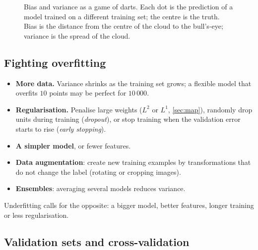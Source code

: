 \begin{figure}[htbp]
\caption{Bias and variance as a game of darts. Each dot is the prediction of a
  model trained on a different training set; the centre is the truth. Bias is
  the distance from the centre of the cloud to the bull's-eye; variance is the
  spread of the cloud.}
\label{fig:bias-variance}
\end{figure}

\subsection{Fighting overfitting}

\begin{itemize}
  \item \textbf{More data.} Variance shrinks as the training set grows; a
    flexible model that overfits $10$ points may be perfect for $10\,000$.
  \item \textbf{Regularisation.} Penalise large weights ($L^2$ or $L^1$,
    \cref{sec:map}), randomly drop units during training (\emph{dropout}), or
    stop training when the validation error starts to rise (\emph{early
    stopping}).
  \item \textbf{A simpler model}, or fewer features.
  \item \textbf{Data augmentation}: create new training examples by
    transformations that do not change the label (rotating or cropping images).
  \item \textbf{Ensembles}: averaging several models reduces variance.
\end{itemize}
Underfitting calls for the opposite: a bigger model, better features, longer
training or less regularisation.

\subsection{Validation sets and cross-validation}

